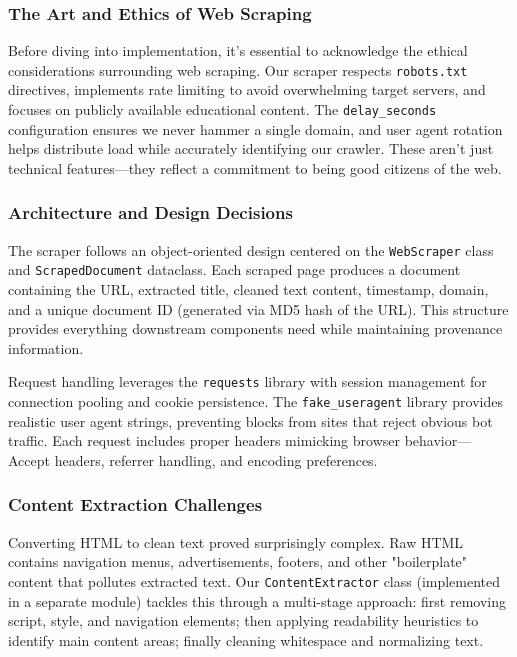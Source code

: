 \documentclass[12pt, a4paper]{article}
\begin{document}
\subsubsection*{The Art and Ethics of Web Scraping}

Before diving into implementation, it's essential to acknowledge the ethical considerations surrounding web scraping. Our scraper respects \texttt{robots.txt} directives, implements rate limiting to avoid overwhelming target servers, and focuses on publicly available educational content. The \texttt{delay\_seconds} configuration ensures we never hammer a single domain, and user agent rotation helps distribute load while accurately identifying our crawler. These aren't just technical features—they reflect a commitment to being good citizens of the web.

\subsubsection*{Architecture and Design Decisions}

The scraper follows an object-oriented design centered on the \texttt{WebScraper} class and \texttt{ScrapedDocument} dataclass. Each scraped page produces a document containing the URL, extracted title, cleaned text content, timestamp, domain, and a unique document ID (generated via MD5 hash of the URL). This structure provides everything downstream components need while maintaining provenance information.

Request handling leverages the \texttt{requests} library with session management for connection pooling and cookie persistence. The \texttt{fake\_useragent} library provides realistic user agent strings, preventing blocks from sites that reject obvious bot traffic. Each request includes proper headers mimicking browser behavior—Accept headers, referrer handling, and encoding preferences.

\subsubsection*{Content Extraction Challenges}

Converting HTML to clean text proved surprisingly complex. Raw HTML contains navigation menus, advertisements, footers, and other "boilerplate" content that pollutes extracted text. Our \texttt{ContentExtractor} class (implemented in a separate module) tackles this through a multi-stage approach: first removing script, style, and navigation elements; then applying readability heuristics to identify main content areas; finally cleaning whitespace and normalizing text.
\end{document}
